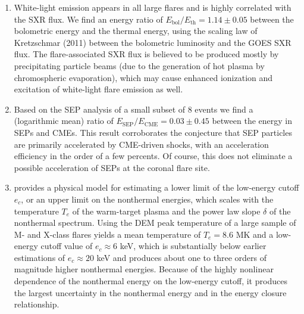 \documentclass[10pt,preprint]{aastex}  %
\begin{document}
\begin{enumerate}
\item{ White-light
emission appears in all large flares and is highly correlated with
the SXR flux. We find an energy ratio of $E_{\mathrm{bol}}/E_{\mathrm{th}}
=1.14 \pm 0.05$ between the bolometric energy and the thermal
energy, using the scaling law of Kretzschmar (2011) between the
bolometric luminosity and the GOES SXR flux. The 
flare-associated SXR flux is believed to be produced mostly by 
precipitating particle beams (due to the generation of hot plasma
by chromospheric evaporation), which may cause enhanced ionization
and excitation of white-light flare emission as well.} 

\item{ Based on the SEP analysis
of a small subset of 8 events we find a (logarithmic mean) ratio of 
$E_{\mathrm{SEP}}/E_{\mathrm{CME}}
=0.03 \pm 0.45$ between the energy in SEPs and CMEs. This
result corroborates the conjecture that SEP particles are 
primarily accelerated
by CME-driven shocks, with an acceleration efficiency in the order
of a few percents. Of course, this does not eliminate a possible
acceleration of SEPs at the coronal flare site.}

\item{ provides a physical model 
for estimating a lower limit of the low-energy cutoff $e_c$, or an 
upper limit on the nonthermal energies, which scales with the 
temperature $T_e$ of the warm-target 
plasma and the power law slope $\delta$ of the nonthermal spectrum.
Using the DEM peak temperature of a large sample of M- and
X-class flares yields a mean temperature of $T_e = 8.6$ MK and
a low-energy cutoff value of $e_c \approx 6$ keV, which is
substantially below earlier estimations of $e_c \approx 20$ keV
and produces about one to three orders of magnitude higher 
nonthermal energies. Because of the highly nonlinear dependence of 
the nonthermal energy on the low-energy cutoff, it produces the 
largest uncertainty in the nonthermal energy and in the energy 
closure relationship.}

\end{enumerate}
\end{document}
